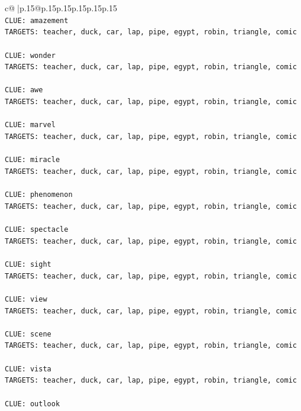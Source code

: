 \documentclass{article}
\begin{document}
{\begin{supertabular}{c@{$\;$}|p{.15\linewidth}@{}p{.15\linewidth}p{.15\linewidth}p{.15\linewidth}p{.15\linewidth}p{.15\linewidth}}
{{{\\ 
\texttt{CLUE: amazement} \\
\texttt{TARGETS: teacher, duck, car, lap, pipe, egypt, robin, triangle, comic} \\
\\ 
\texttt{CLUE: wonder} \\
\texttt{TARGETS: teacher, duck, car, lap, pipe, egypt, robin, triangle, comic} \\
\\ 
\texttt{CLUE: awe} \\
\texttt{TARGETS: teacher, duck, car, lap, pipe, egypt, robin, triangle, comic} \\
\\ 
\texttt{CLUE: marvel} \\
\texttt{TARGETS: teacher, duck, car, lap, pipe, egypt, robin, triangle, comic} \\
\\ 
\texttt{CLUE: miracle} \\
\texttt{TARGETS: teacher, duck, car, lap, pipe, egypt, robin, triangle, comic} \\
\\ 
\texttt{CLUE: phenomenon} \\
\texttt{TARGETS: teacher, duck, car, lap, pipe, egypt, robin, triangle, comic} \\
\\ 
\texttt{CLUE: spectacle} \\
\texttt{TARGETS: teacher, duck, car, lap, pipe, egypt, robin, triangle, comic} \\
\\ 
\texttt{CLUE: sight} \\
\texttt{TARGETS: teacher, duck, car, lap, pipe, egypt, robin, triangle, comic} \\
\\ 
\texttt{CLUE: view} \\
\texttt{TARGETS: teacher, duck, car, lap, pipe, egypt, robin, triangle, comic} \\
\\ 
\texttt{CLUE: scene} \\
\texttt{TARGETS: teacher, duck, car, lap, pipe, egypt, robin, triangle, comic} \\
\\ 
\texttt{CLUE: vista} \\
\texttt{TARGETS: teacher, duck, car, lap, pipe, egypt, robin, triangle, comic} \\
\\ 
\texttt{CLUE: outlook} \\
}}}
\end{supertabular}}
\end{document}
